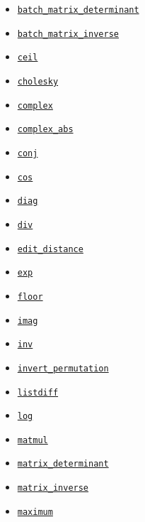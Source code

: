 \begin{itemize}
\item
  \href{../../api_docs/python/math_ops.md\#batch_matrix_determinant}{\texttt{batch\_matrix\_determinant}}
\item
  \href{../../api_docs/python/math_ops.md\#batch_matrix_inverse}{\texttt{batch\_matrix\_inverse}}
\item
  \href{../../api_docs/python/math_ops.md\#ceil}{\texttt{ceil}}
\item
  \href{../../api_docs/python/math_ops.md\#cholesky}{\texttt{cholesky}}
\item
  \href{../../api_docs/python/math_ops.md\#complex}{\texttt{complex}}
\item
  \href{../../api_docs/python/math_ops.md\#complex_abs}{\texttt{complex\_abs}}
\item
  \href{../../api_docs/python/math_ops.md\#conj}{\texttt{conj}}
\item
  \href{../../api_docs/python/math_ops.md\#cos}{\texttt{cos}}
\item
  \href{../../api_docs/python/math_ops.md\#diag}{\texttt{diag}}
\item
  \href{../../api_docs/python/math_ops.md\#div}{\texttt{div}}
\item
  \href{../../api_docs/python/math_ops.md\#edit_distance}{\texttt{edit\_distance}}
\item
  \href{../../api_docs/python/math_ops.md\#exp}{\texttt{exp}}
\item
  \href{../../api_docs/python/math_ops.md\#floor}{\texttt{floor}}
\item
  \href{../../api_docs/python/math_ops.md\#imag}{\texttt{imag}}
\item
  \href{../../api_docs/python/math_ops.md\#inv}{\texttt{inv}}
\item
  \href{../../api_docs/python/math_ops.md\#invert_permutation}{\texttt{invert\_permutation}}
\item
  \href{../../api_docs/python/math_ops.md\#listdiff}{\texttt{listdiff}}
\item
  \href{../../api_docs/python/math_ops.md\#log}{\texttt{log}}
\item
  \href{../../api_docs/python/math_ops.md\#matmul}{\texttt{matmul}}
\item
  \href{../../api_docs/python/math_ops.md\#matrix_determinant}{\texttt{matrix\_determinant}}
\item
  \href{../../api_docs/python/math_ops.md\#matrix_inverse}{\texttt{matrix\_inverse}}
\item
  \href{../../api_docs/python/math_ops.md\#maximum}{\texttt{maximum}}

\end{itemize}
